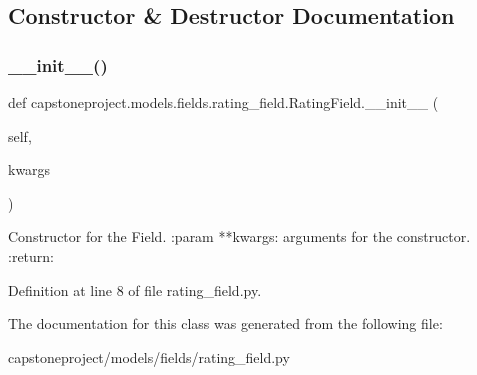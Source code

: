 \subsection{Constructor \& Destructor Documentation}
\mbox{\label{classcapstoneproject_1_1models_1_1fields_1_1rating__field_1_1_rating_field_a50e1b73b2e646ba737f5619e68a4bc06}} 
\subsubsection{\texorpdfstring{\+\_\+\+\_\+init\+\_\+\+\_\+()}{\_\_init\_\_()}}
{\footnotesize\ttfamily def capstoneproject.\+models.\+fields.\+rating\+\_\+field.\+Rating\+Field.\+\_\+\+\_\+init\+\_\+\+\_\+ (\begin{DoxyParamCaption}\item[{}]{self,  }\item[{}]{kwargs }\end{DoxyParamCaption})}

\begin{DoxyVerb}Constructor for the Field.
:param **kwargs: arguments for the constructor.
:return:
\end{DoxyVerb}
 

Definition at line 8 of file rating\+\_\+field.\+py.



The documentation for this class was generated from the following file\+:\begin{DoxyCompactItemize}
\item 
capstoneproject/models/fields/rating\+\_\+field.\+py\end{DoxyCompactItemize}

